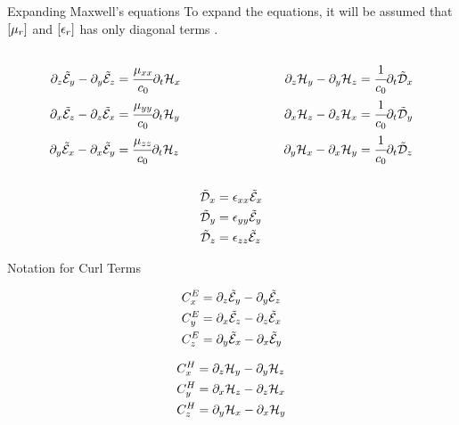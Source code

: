 \documentclass{beamer}
\begin{document}
\begin{frame}{Expanding Maxwell's equations}
  To expand the equations, it will be assumed that $\brackets{\mu_r}$ and $\brackets{\epsilon_r}$ has only diagonal terms \cite{rumpf_book}. 
  \begin{columns}
    \begin{column}{0.45\textwidth}
      \begin{align}
        \partial_z\tilde{\mathcal{E}}_y - \partial_y\tilde{\mathcal{E}}_z &= \cfrac{\mu_{xx}}{c_0} \partial_t \mathcal{H}_x \\
        \partial_x\tilde{\mathcal{E}}_z - \partial_z\tilde{\mathcal{E}}_x &= \cfrac{\mu_{yy}}{c_0} \partial_t \mathcal{H}_y\\
        \partial_y\tilde{\mathcal{E}}_x - \partial_x\tilde{\mathcal{E}}_y &= \cfrac{\mu_{zz}}{c_0} \partial_t \mathcal{H}_z
      \end{align}
    \end{column}
    \begin{column}{0.45\textwidth}
      \begin{align}
        \partial_z\mathcal{H}_y - \partial_y\mathcal{H}_z &= \cfrac{1}{c_0} \partial_t \tilde{\mathcal{D}}_x \\
        \partial_x\mathcal{H}_z - \partial_z\mathcal{H}_x &= \cfrac{1}{c_0} \partial_t \tilde{\mathcal{D}}_y \\
        \partial_y\mathcal{H}_x - \partial_x\mathcal{H}_y &= \cfrac{1}{c_0} \partial_t \tilde{\mathcal{D}}_z
    \end{align}

    \end{column}

  \end{columns}

  \begin{align}
      \tilde{\mathcal{D}}_x &= \epsilon_{xx} \tilde{\mathcal{E}}_x \label{eq:Dn_x}\\
      \tilde{\mathcal{D}}_y &= \epsilon_{yy} \tilde{\mathcal{E}}_y \label{eq:Dn_y}\\
      \tilde{\mathcal{D}}_z &= \epsilon_{zz} \tilde{\mathcal{E}}_z \label{eq:Dn_z}
  \end{align}
\end{frame}


\begin{frame}{Notation for Curl Terms}

  \begin{align}
    C_x^E &= \partial_z\tilde{\mathcal{E}}_y - \partial_y\tilde{\mathcal{E}}_z \\
    C_y^E &= \partial_x\tilde{\mathcal{E}}_z - \partial_z\tilde{\mathcal{E}}_x \\
    C_z^E &= \partial_y\tilde{\mathcal{E}}_x - \partial_x\tilde{\mathcal{E}}_y
  \end{align}

  \begin{align}
    C_x^H &= \partial_z\mathcal{H}_y - \partial_y\mathcal{H}_z \\
    C_y^H &= \partial_x\mathcal{H}_z - \partial_z\mathcal{H}_x \\
    C_z^H &= \partial_y\mathcal{H}_x - \partial_x\mathcal{H}_y
  \end{align}

\end{frame}
\end{document}
